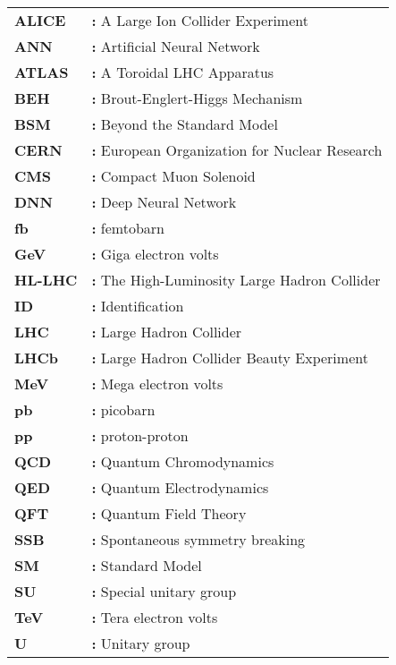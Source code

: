 \begin{tabular}{@{}p{2cm}l}
{\bf ALICE} & {\bf:} A Large Ion Collider Experiment\\
{\bf ANN} & {\bf:} Artificial Neural Network\\
{\bf ATLAS} & {\bf:} A Toroidal LHC Apparatus\\
{\bf BEH} & {\bf:} Brout-Englert-Higgs Mechanism\\
{\bf BSM} & {\bf:} Beyond the Standard Model\\
{\bf CERN} & {\bf:} European Organization for Nuclear Research\\
{\bf CMS} & {\bf:} Compact Muon Solenoid\\
{\bf DNN} & {\bf:} Deep Neural Network\\
{\bf fb} & {\bf:} femtobarn\\
{\bf GeV} & {\bf:} Giga electron volts\\
{\bf HL-LHC} & {\bf:} The High-Luminosity Large Hadron Collider\\
{\bf ID} & {\bf:} Identification\\
{\bf LHC} & {\bf:} Large Hadron Collider\\
{\bf LHCb} & {\bf:} Large Hadron Collider Beauty Experiment\\
{\bf MeV} & {\bf:} Mega electron volts\\
{\bf pb} & {\bf:} picobarn\\
{\bf pp} & {\bf:} proton-proton\\
{\bf QCD} & {\bf:} Quantum Chromodynamics\\
{\bf QED} & {\bf:} Quantum Electrodynamics\\
{\bf QFT} & {\bf:} Quantum Field Theory\\
{\bf SSB} & {\bf:} Spontaneous symmetry breaking\\
{\bf SM} & {\bf:} Standard Model\\
{\bf SU} & {\bf:} Special unitary group\\
{\bf TeV} & {\bf:} Tera electron volts\\
{\bf U} & {\bf:} Unitary group\\
\end{tabular}

